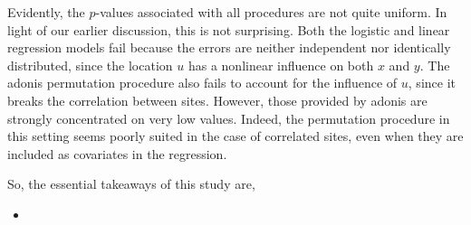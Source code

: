 \documentclass{article}
\begin{document}
Evidently, the $p$-values associated with all procedures are not quite uniform.
In light of our earlier discussion, this is not surprising. Both the logistic
and linear regression models fail because the errors are neither independent nor
identically distributed, since the location $u$ has a nonlinear influence on
both $x$ and $y$. The adonis permutation procedure also fails to account for the
influence of $u$, since it breaks the correlation between sites. However, those
provided by adonis are strongly concentrated on very low values. Indeed, the
permutation procedure in this setting seems poorly suited in the case of
correlated sites, even when they are included as covariates in the regression.

So, the essential takeaways of this study are,

\begin{itemize}
\item 
\end{itemize}



\end{document}
